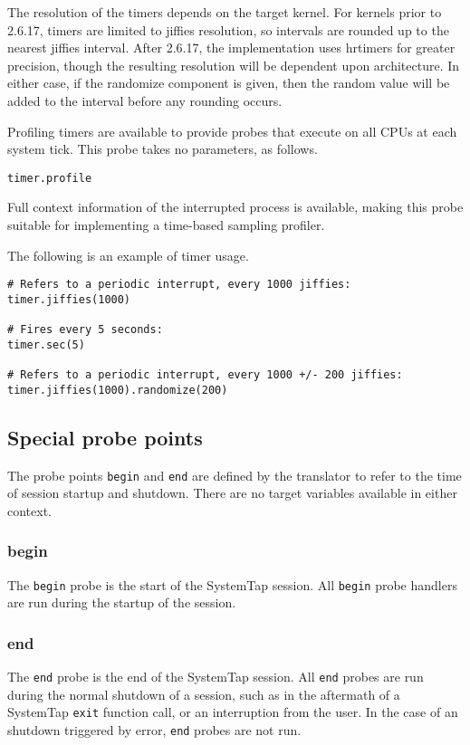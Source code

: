 \documentclass[twoside,english]{article}
\newenvironment{vindent}
{\begin{list}{}{\setlength{\listparindent}{6pt}}
\item[]}
{\end{list}}
\begin{document}
The resolution of the timers depends on the target kernel. For kernels prior
to 2.6.17, timers are limited to jiffies resolution, so intervals are rounded
up to the nearest jiffies interval. After 2.6.17, the implementation uses
hrtimers for greater precision, though the resulting resolution will be dependent
upon architecture. In either case, if the randomize component is given, then
the random value will be added to the interval before any rounding occurs.

Profiling timers are available to provide probes that execute on all CPUs
at each system tick. This probe takes no parameters, as follows.

\begin{vindent}
\begin{verbatim}
timer.profile
\end{verbatim}
\end{vindent}
Full context information of the interrupted process is available, making
this probe suitable for implementing a time-based sampling profiler.

The following is an example of timer usage.

\begin{vindent}
\begin{verbatim}
# Refers to a periodic interrupt, every 1000 jiffies:
timer.jiffies(1000)

# Fires every 5 seconds:
timer.sec(5)

# Refers to a periodic interrupt, every 1000 +/- 200 jiffies:
timer.jiffies(1000).randomize(200)
\end{verbatim}
\end{vindent}

\subsection{Special probe points}

The probe points \texttt{begin} and \texttt{end} are defined by the translator
to refer to the time of session startup and shutdown. There are no target
variables available in either context.


\subsubsection{begin}
The \texttt{begin} probe is the start of the SystemTap session.
All \texttt{begin}
probe handlers are run during the startup of the session.


\subsubsection{end}
The \texttt{end} probe is the end of the SystemTap session. All \texttt{end}
probes are run during the normal shutdown of a session, such as in the aftermath
of a SystemTap \texttt{exit} function call, or an interruption from the user.
In the case of an shutdown triggered by error, \texttt{end} probes are not run.
\end{document}
